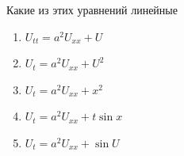 Какие из этих уравнений линейные

\begin{enumerate}[label=\arabic*)]
    \item \(U_{tt}=a^2U_{xx}+U\)
    \item \(U_t=a^2U_{xx}+U^2\)
    \item \(U_t=a^2U_{xx}+x^2\)
    \item \(U_t=a^2U_{xx}+t \sin x\)
    \item \(U_t=a^2U_{xx}+\sin U\)
\end{enumerate}

